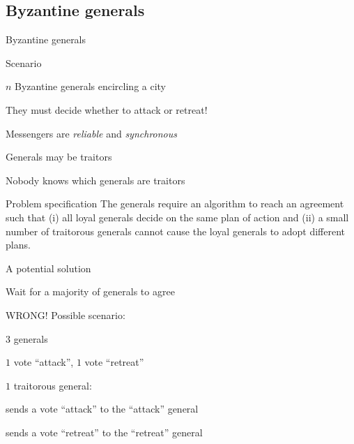 \subsection{Byzantine generals}

\begin{frame}{Byzantine generals}
\begin{block}{Scenario~\cite{pearls-of-theory}}
\BI
\item $n$ Byzantine generals encircling a city
\item They must decide whether to attack or retreat!
\item Messengers are \emph{reliable} and \emph{synchronous}
\item Generals may be traitors
\item Nobody knows which generals are traitors
\EI	
\end{block}

\begin{block}{Problem specification}
The generals require an algorithm to reach an agreement such that (i) all loyal generals decide on the same plan of action and (ii) a small number of traitorous generals cannot cause the loyal generals to adopt different plans.
\end{block}

\end{frame}

\begin{frame}{A potential solution}

\BI
\item Wait for a majority of generals to agree
\EI

\pause
\bigskip
WRONG! Possible scenario:
\BI
\item $3$ generals
\item $1$ vote “attack”, $1$ vote “retreat”
\item $1$ traitorous general:
\BI
\item sends a vote “attack” to the “attack” general
\item sends a vote “retreat” to the “retreat” general
\EI
\EI

\end{frame}

